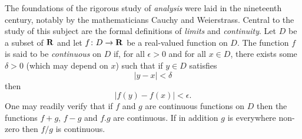 The foundations of the rigorous study of {\it analysis}
were laid in the nineteenth century, notably by the
mathematicians Cauchy and Weierstrass. Central to the
study of this subject are the formal definitions of
{\it limits} and {\it continuity}.
Let $D$ be a subset of $\bf R$ and let
$f \colon D \to {\bf R}$ be a real-valued function on
$D$. The function $f$ is said to be {\it continuous} on
$D$ if, for all $\epsilon > 0$ and for all $x \in D$,
there exists some $\delta > 0$ (which may depend on $x$)
such that if $y \in D$ satisfies
$$|y - x| < \delta$$
then
$$|f(y) - f(x)| < \epsilon.$$
One may readily verify that if $f$ and $g$ are continuous
functions on $D$ then the functions $f+g$, $f-g$ and
$f.g$ are continuous. If in addition $g$ is everywhere
non-zero then $f/g$ is continuous.

\bye
